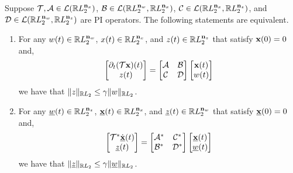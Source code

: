 \begin{theorem}\label{thm:ogduality}
    Suppose $\mathcal{T}, \mathcal{A}\in\mathcal{L}(\mathbb{R} L_2^{\mathbf{n}_x})$, $\mathcal{B}\in\mathcal{L}(\mathbb{R} L_2^{\mathbf{n}_w},\mathbb{R} L_2^{\mathbf{n}_x})$, $\mathcal{C}\in\mathcal{L}(\mathbb{R} L_2^{\mathbf{n}_x}, \mathbb{R} L_2^{\mathbf{n}_z})$, and $\mathcal{D}\in\mathcal{L}(\mathbb{R} L_2^{\mathbf{n}_w},\mathbb{R} L_2^{\mathbf{n}_z})$  are PI operators. The following statements are equivalent.
    \begin{enumerate}[label=\alph*)]
        \item For any $w(t)\in \mathbb{R} L_2^{\mathbf{n}_w}$, $x(t)\in \mathbb{R} L_2^{\mathbf{n}_x}$, and $z(t)\in \mathbb{R} L_2^{\mathbf{n}_z}$ that satisfy $\mathbf{x}(0) = 0$ and,
        \begin{equation}\label{eqn:primal system}
            \begin{bmatrix}\partial_t(\mathcal{T}\mathbf{x})(t)\\z(t)\end{bmatrix}=\begin{bmatrix}\mathcal{A} & \mathcal{B} \\ \mathcal{C} & \mathcal{D}\end{bmatrix}\begin{bmatrix}\mathbf{x}(t)\\ w(t)\end{bmatrix}
        \end{equation}
        we have that $\|z\|_{\mathbb{R} L_2} \leq \gamma\|w\|_{\mathbb{R} L_2}$.
        \item For any $\underline{w}(t)\in \mathbb{R} L_2^{\mathbf{n}_z}$, $\underline{\mathbf{x}}(t)\in \mathbb{R} L_2^{\mathbf{n}_x}$, and $\underline{z}(t)\in \mathbb{R} L_2^{\mathbf{n}_w}$ that satisfy $\underline{\mathbf{x}}(0) = 0$ and,
        \begin{equation}\label{eqn:dual system}
            \begin{bmatrix}\mathcal{T}^*\dot{\underline{\mathbf{x}}}(t)\\\underline{z}(t)\end{bmatrix}=\begin{bmatrix}\mathcal{A}^* & \mathcal{C}^* \\ \mathcal{B}^* & \mathcal{D}^*\end{bmatrix}\begin{bmatrix}\underline{\mathbf{x}}(t)\\ \underline{w}(t)\end{bmatrix}
        \end{equation}
        we have that $\|\underline{z}\|_{\mathbb{R} L_2} \leq \gamma\|\underline{w}\|_{\mathbb{R} L_2}$.
    \end{enumerate}
\end{theorem}
